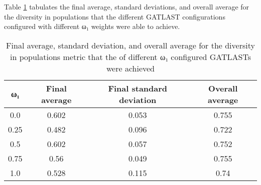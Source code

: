 Table \ref{tab:HP:GA:LTLWeight:diversity in populations} tabulates the final average, standard deviations, and overall average for the diversity in populations that the different GATLAST configurations configured with different ω₁ weights were able to achieve.
\begin{table}[tbh!]
\centering
\begin{adjustbox}{trim=0cm 0cm 0cm 0cm, clip=true}
\begin{tabular}{|c|c|c|c|}
\hline
ω₁ & Final average & Final standard deviation & Overall average\\
\hline
0.0 & 0.602 & 0.053 & 0.755\\\hline
0.25 & 0.482 & 0.096 & 0.722\\\hline
0.5 & 0.602 & 0.057 & 0.752\\\hline
0.75 & 0.56 & 0.049 & 0.755\\\hline
1.0 & 0.528 & 0.115 & 0.74\\\hline
\end{tabular}
\end{adjustbox}
\caption{Final average, standard deviation, and overall average for the diversity in populations metric that the of different ω₁ configured GATLASTs were achieved}
\label{tab:HP:GA:LTLWeight:diversity in populations}
\end{table}